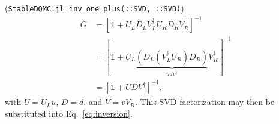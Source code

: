 \documentclass[submission, Phys]{SciPost}
\begin{document}
\begin{appendix}
(\texttt{StableDQMC.jl}: \texttt{inv\_one\_plus(::SVD, ::SVD)})
\begin{align}
G &= \left[\mathbb{1} + U_L D_L V_L^\dagger U_R D_R V_R^\dagger \right]^{-1} \nonumber \\
&= \left[\mathbb{1} + U_L \underbrace{\left( D_L \left( V_L^\dagger U_R \right) D_R \right)}_{udv^\dagger} V_R^\dagger \right]^{-1} \\
&= \left[\mathbb{1} + U D V^\dagger \right]^{-1},\nonumber
\end{align}
with $U=U_Lu$, $D=d$, and $V=v V_R$. This SVD factorization may then be substituted into Eq.~\eqref{eq:inversion}.

	
\end{appendix}







\nolinenumbers
\end{document}
